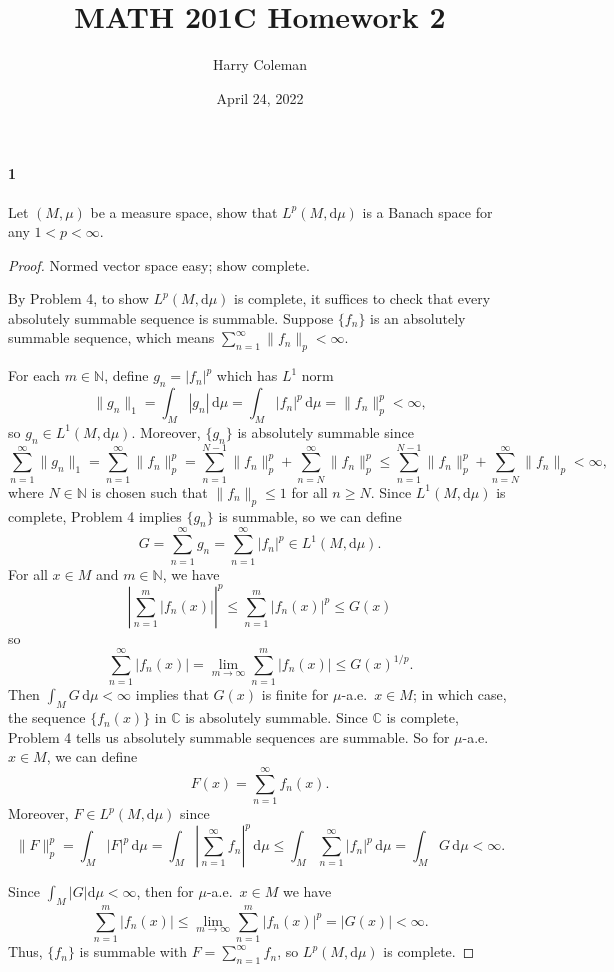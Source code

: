 \documentclass[12pt]{article}
\renewcommand{\maketitle}{\thispagestyle{title}}
\newlength{\myparskip}
\newenvironment{fullbox}{\begin{lrbox}{\savefullbox}\begin{minipage}{\dimexpr\textwidth-2\fboxsep\relax}\setlength{\parskip}{\myparskip}}{\end{minipage}\end{lrbox}\framebox[\textwidth]{\usebox{\savefullbox}}}
\newenvironment{pbox}[1][]{\begin{fullbox}\def\temp{#1}\ifx\temp\empty\else\paragraph{#1}\phantom{}\fi}{\end{fullbox}}
\theoremstyle{definition}
\newcommand{\N}{\mathbb{N}}
\newcommand{\C}{\mathbb{C}}
\newcommand{\<}{\langle}
\renewcommand{\>}{\rangle}
\newcommand{\dd}{\mathrm{d}}
\begin{document}
\title{MATH 201C Homework 2}
\author{Harry Coleman}
\date{April 24, 2022}
\maketitle

\begin{pbox}[1]
    Let $(M, \mu)$ be a measure space, show that $L^p(M, \dd{\mu})$ is a Banach space for any $1 < p < \infty$.
\end{pbox}

\begin{proof}
    Normed vector space easy; show complete.

    By Problem 4, to show $L^p(M, \dd\mu)$ is complete, it suffices to check that every absolutely summable sequence is summable.
    Suppose $\{f_n\}$ is an absolutely summable sequence, which means $\sum_{n=1}^{\infty} \|f_n\|_p < \infty$.

    For each $m \in \N$, define $g_n = |f_n|^p$
    which has $L^1$ norm
    \[
        \|g_n\|_1
            = \int_M |g_n| \,\dd\mu
            = \int_M |f_n|^p \,\dd\mu
            = \|f_n\|_p^p
            < \infty, 
    \]
    so $g_n \in L^1(M, \dd\mu)$.
    Moreover, $\{g_n\}$ is absolutely summable since
    \[
        \sum_{n=1}^{\infty} \|g_n\|_1
            = \sum_{n=1}^{\infty} \|f_n\|_p^p
            = \sum_{n=1}^{N-1} \|f_n\|_p^p + \sum_{n=N}^{\infty} \|f_n\|_p^p
            \leq  \sum_{n=1}^{N-1} \|f_n\|_p^p + \sum_{n=N}^{\infty} \|f_n\|_p
            < \infty,
    \]
    where $N \in \N$ is chosen such that $\|f_n\|_p \leq 1$ for all $n \geq N$.
    Since $L^1(M, \dd\mu)$ is complete, Problem 4 implies $\{g_n\}$ is summable, so we can define
    \[
        G
            = \sum_{n=1}^{\infty} g_n
            = \sum_{n=1}^{\infty} |f_n|^p
            \in L^1(M, \dd\mu).
    \]
    For all $x \in M$ and $m \in \N$, we have
    \[
        \left|\sum_{n=1}^{m} |f_n(x)|\right|^p
            \leq \sum_{n=1}^{m} |f_n(x)|^p
            \leq G(x)
    \]
    so
    \[
        \sum_{n=1}^{\infty} |f_n(x)|
            = \lim_{m \to \infty} \sum_{n=1}^{m} |f_n(x)|
            \leq G(x)^{1/p}.
    \]
    Then $\int_M G \,\dd\mu < \infty$ implies that $G(x)$ is finite for $\mu$-a.e.\ $x \in M$; in which case, the sequence $\{f_n(x)\}$ in $\C$ is absolutely summable.
    Since $\C$ is complete, Problem 4 tells us absolutely summable sequences are summable.
    So for $\mu$-a.e.\ $x \in M$, we can define
    \[
        F(x) = \sum_{n=1}^{\infty} f_n(x).
    \]
    Moreover, $F \in L^p(M, \dd\mu)$ since
    \[
        \|F\|_p^p
            = \int_M |F|^p \,\dd\mu
            = \int_M \left|\sum_{n=1}^{\infty} f_n \right|^p \,\dd\mu
            \leq \int_M \sum_{n=1}^{\infty} |f_n|^p \,\dd\mu
            = \int_M G \,\dd\mu 
            < \infty.
    \]


    Since $\int_M |G| \dd\mu < \infty$, then for $\mu$-a.e.\ $x \in M$ we have
    \[
            \sum_{n=1}^{m} |f_n(x)|
                \leq 
        \lim_{m \to \infty} \sum_{n=1}^{m} |f_n(x)|^p
            = |G(x)|
            < \infty.
    \]
    Thus, $\{f_n\}$ is summable with $F = \sum_{n=1}^{\infty} f_n$, so $L^p(M, \dd\mu)$ is complete.
\end{proof}
\end{document}
